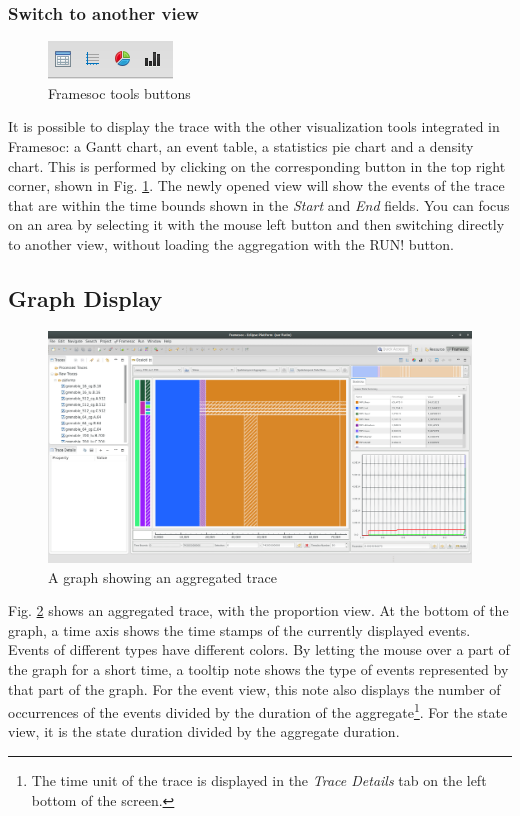 \documentclass[twoside]{article}
\begin{document}
\begin{sloppypar}
\subsubsection{Switch to another view}
\begin{figure}[h!]
	\centering
	\includegraphics[scale=1.0]{images/framesoc_buttons.png}
	\caption{Framesoc tools buttons}
	\label{framesocTools}
\end{figure}
It is possible to display the trace with the other visualization tools integrated in Framesoc: a Gantt chart, an event table, a statistics pie chart and a density chart. This is performed by clicking on the corresponding button in the top right corner, shown in Fig. \ref{framesocTools}. The newly opened view will show the events of the trace that are within the time bounds shown in the \textit{Start} and \textit{End} fields. You can focus on an area by selecting it with the mouse left button and then switching directly to another view, without loading the aggregation with the RUN! button. 

\subsection{Graph Display}
\begin{figure}[h!]
	\centering
	\includegraphics[width=1.0\textwidth]{images/ocelotlAggregated.png}
	\caption{A graph showing an aggregated trace}
	\label{showAggreg}
\end{figure}

Fig. \ref{showAggreg} shows an aggregated trace, with the proportion view. At the bottom of the graph, a time axis shows the time stamps of the currently displayed events. Events of different types have different colors. By letting the mouse over a part of the graph for a short time, a tooltip note shows the type of events represented by that part of the graph. For the event view, this note also displays the number of occurrences of the events divided by the duration of the aggregate\footnote{The time unit of the trace is displayed in the \textit{Trace Details} tab on the left bottom of the screen.}. For the state view, it is the state duration divided by the aggregate duration.


\end{sloppypar}
\end{document}
